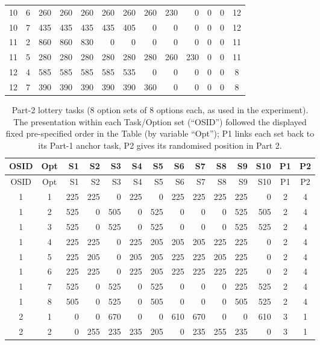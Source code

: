 {\begin{longtable}{cc*{10}{r}c}
10 & 6 & 260 & 260 & 260 & 260 & 260 & 260 & 230 & 0 & 0 & 0 & 12 \\
10 & 7 & 435 & 435 & 435 & 435 & 405 & 0 & 0 & 0 & 0 & 0 & 12 \\\midrule
11 & 2 & 860 & 860 & 830 & 0 & 0 & 0 & 0 & 0 & 0 & 0 & 11 \\
11 & 5 & 280 & 280 & 280 & 280 & 280 & 280 & 260 & 230 & 0 & 0 & 11 \\\midrule
12 & 4 & 585 & 585 & 585 & 585 & 535 & 0 & 0 & 0 & 0 & 0 & 8 \\
12 & 7 & 390 & 390 & 390 & 390 & 390 & 360 & 0 & 0 & 0 & 0 & 8 \\
\bottomrule
\end{longtable}
}

{\small
\setlength{\tabcolsep}{2.5pt}
\begin{longtable}{cc*{10}{r}cc}
\caption{Part-2 lottery tasks (8 option sets of 8 options each, as used in the experiment). The presentation within each Task/Option set (``OSID'') followed the displayed fixed pre-specified order in the Table (by variable ``Opt''); P1 links each set back to its Part-1 anchor task, P2 gives its randomised position in Part 2.}
\label{tab:appendix_part2}\\
\toprule
OSID & Opt & S1 & S2 & S3 & S4 & S5 & S6 & S7 & S8 & S9 & S10 & P1 & P2 \\
\midrule
\endfirsthead
\toprule
OSID & Opt & S1 & S2 & S3 & S4 & S5 & S6 & S7 & S8 & S9 & S10 & P1 & P2 \\
\midrule
\endhead
1 & 1 & 225 & 225 & 0 & 225 & 0 & 225 & 225 & 225 & 225 & 0 & 2 & 4 \\
1 & 2 & 525 & 0 & 505 & 0 & 525 & 0 & 0 & 0 & 525 & 505 & 2 & 4 \\
1 & 3 & 525 & 0 & 525 & 0 & 525 & 0 & 0 & 0 & 525 & 525 & 2 & 4 \\
1 & 4 & 225 & 225 & 0 & 225 & 205 & 205 & 205 & 225 & 225 & 0 & 2 & 4 \\
1 & 5 & 225 & 205 & 0 & 205 & 205 & 225 & 225 & 205 & 225 & 0 & 2 & 4 \\
1 & 6 & 225 & 225 & 0 & 225 & 205 & 225 & 225 & 225 & 225 & 0 & 2 & 4 \\
1 & 7 & 525 & 0 & 525 & 0 & 525 & 0 & 0 & 0 & 225 & 525 & 2 & 4 \\
1 & 8 & 505 & 0 & 525 & 0 & 505 & 0 & 0 & 0 & 505 & 525 & 2 & 4 \\\midrule
2 & 1 & 0 & 0 & 670 & 0 & 0 & 610 & 670 & 0 & 0 & 610 & 3 & 1 \\
2 & 2 & 0 & 255 & 235 & 235 & 205 & 0 & 235 & 255 & 235 & 0 & 3 & 1 \\

\end{longtable}}
